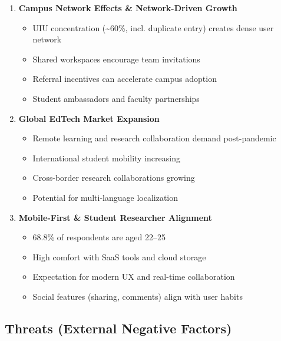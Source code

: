 \begin{enumerate}
    \item \textbf{Campus Network Effects \& Network-Driven Growth}
          \begin{itemize}
              \item UIU concentration (\textasciitilde{}60\%, incl. duplicate entry) creates dense user network
              \item Shared workspaces encourage team invitations
              \item Referral incentives can accelerate campus adoption
              \item Student ambassadors and faculty partnerships
          \end{itemize}

    \item \textbf{Global EdTech Market Expansion}
          \begin{itemize}
              \item Remote learning and research collaboration demand post-pandemic
              \item International student mobility increasing
              \item Cross-border research collaborations growing
              \item Potential for multi-language localization
          \end{itemize}

    \item \textbf{Mobile-First \& Student Researcher Alignment}
          \begin{itemize}
              \item 68.8\% of respondents are aged 22--25
              \item High comfort with SaaS tools and cloud storage
              \item Expectation for modern UX and real-time collaboration
              \item Social features (sharing, comments) align with user habits
          \end{itemize}
\end{enumerate}

\subsection{Threats (External Negative Factors)}

